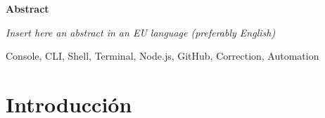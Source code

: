 \documentclass[spanish,a4paper,14pt,oneside]{extreport}
\newenvironment{summary}
{\par\noindent\begin{center}\textbf{Abstract}\end{center}\begin{itshape}\par\noindent}
{\end{itshape}}
\newenvironment{keywords}
{\begin{list}{}{\setlength{\leftmargin}{1em}}\item[\hskip\labelsep \bfseries Keywords:]}
{\end{list}}
\begin{document}
\newpage  %
\begin{summary}
{\em
Insert here an abstract in an EU language (preferably English)
}

\begin{keywords}
Console, CLI, Shell, Terminal, Node.js, GitHub, Correction, Automation
\end{keywords}

\end{summary}

\newpage{\pagestyle{empty}}
\thispagestyle{empty}



\pagestyle{myheadings} %

\renewcommand{\thepage}{\roman{page}}
\setcounter{page}{1}


\tableofcontents

\newpage{\pagestyle{empty}}

\listoffigures

\newpage{\pagestyle{empty}}

\listoftables

\newpage{\pagestyle{empty}}

\renewcommand{\thepage}{\arabic{page}}
\setcounter{page}{1}


\chapter{Introducción}
\label{chapter:intro}
\end{document}
